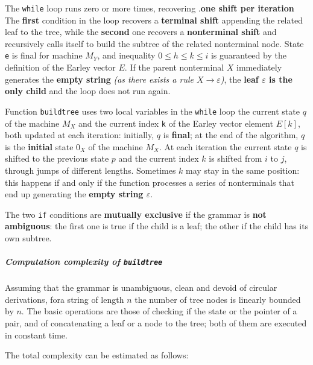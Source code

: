 \documentclass[english]{article}
\begin{document}
The \texttt{while} loop runs zero or more times, recovering .\textbf{one shift per iteration}
The \textbf{first} condition in the loop recovers a \textbf{terminal shift} appending the related leaf to the tree, while the \textbf{second} one recovers a \textbf{nonterminal shift} and recursively calls itself to build the subtree of the related nonterminal node.
State \texttt{e} is final for machine \(M_Y\), and inequality \(0 \leq h \leq k \leq i\) is guaranteed by the definition of the Earley vector \(E\).
If the parent nonterminal \(X\) immediately generates the \textbf{empty string} \textit{(as there exists a rule \(X \rightarrow \varepsilon\))}, the \textbf{leaf \(\varepsilon\) is the only child} and the loop does not run again.

Function \texttt{buildtree} uses two local variables in the \texttt{while} loop the current state \(q\) of the machine \(M_X\) and the current index \texttt{k} of the Earley vector element \(E[k]\), both updated at each iteration:
initially, \(q\) is \textbf{final}; at the end of the algorithm, \(q\) is the \textbf{initial} state \(0_X\) of the machine \(M_X\).
At each iteration the current state \(q\) is shifted to the previous state \(p\) and the current index \(k\) is shifted from \(i\) to \(j\), through jumps of different lengths.
Sometimes \(k\) may stay in the same position: this happens if and only if the function processes a series of nonterminals that end up generating the \textbf{empty string \(\varepsilon\)}.

The two \texttt{if} conditions are \textbf{mutually exclusive} if the grammar is \textbf{not ambiguous}:
the first one is true if the child is a leaf; the other if the child has its own subtree.

\subparagraph*{Computation complexity of \texttt{buildtree}}

Assuming that the grammar is unambiguous, clean and devoid of circular derivations, fora string of length \(n\) the number of tree nodes is linearly bounded by \(n\).
The basic operations are those of checking if the state or the pointer of a pair, and of concatenating a leaf or a node to the tree; both of them are executed in constant time.

The total complexity can be estimated as follows:
\end{document}

